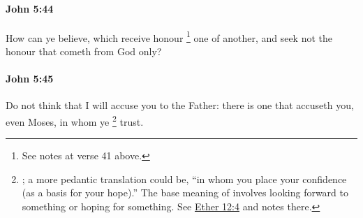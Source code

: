 		\paragraph{John 5:44} %
			\label{JOHN-5-44}

			How can ye believe, which receive honour%
				\footnote{%
					See notes at verse 41 above.
					}
			one of another, and seek not the honour that cometh from God only?

			\begin{framed}
			\scriptsize
				\begin{compactdesc}
					\item[SBLG] 
				\end{compactdesc}
			\end{framed}

		\paragraph{John 5:45} %
			\label{JOHN-5-45}

			Do not think that I will accuse you to the Father: there is one that accuseth you, even Moses, in whom ye
				\footnote{%
					; a more pedantic translation could be, ``in whom you place your confidence (as a basis for your hope).'' The base meaning of  involves looking forward to something or hoping for something. See \hyperref[ETHER-12-4]{Ether 12:4} and notes there.
					}%
			trust.

